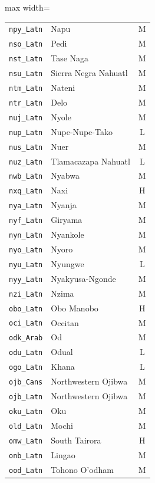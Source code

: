 {\begin{adjustbox}{max width=\textwidth}
\begin{tabular}{llc}
        \texttt{npy\_Latn} & Napu & M \\
        \texttt{nso\_Latn} & Pedi & M \\
        \texttt{nst\_Latn} & Tase Naga & M \\
        \texttt{nsu\_Latn} & Sierra Negra Nahuatl & M \\
        \texttt{ntm\_Latn} & Nateni & M \\
        \texttt{ntr\_Latn} & Delo & M \\
        \texttt{nuj\_Latn} & Nyole & M \\
        \texttt{nup\_Latn} & Nupe-Nupe-Tako & L \\
        \texttt{nus\_Latn} & Nuer & M \\
        \texttt{nuz\_Latn} & Tlamacazapa Nahuatl & L \\
        \texttt{nwb\_Latn} & Nyabwa & M \\
        \texttt{nxq\_Latn} & Naxi & H \\
        \texttt{nya\_Latn} & Nyanja & M \\
        \texttt{nyf\_Latn} & Giryama & M \\
        \texttt{nyn\_Latn} & Nyankole & M \\
        \texttt{nyo\_Latn} & Nyoro & M \\
        \texttt{nyu\_Latn} & Nyungwe & L \\
        \texttt{nyy\_Latn} & Nyakyusa-Ngonde & M \\
        \texttt{nzi\_Latn} & Nzima & M \\
        \texttt{obo\_Latn} & Obo Manobo & H \\
        \texttt{oci\_Latn} & Occitan & M \\
        \texttt{odk\_Arab} & Od & M \\
        \texttt{odu\_Latn} & Odual & L \\
        \texttt{ogo\_Latn} & Khana & L \\
        \texttt{ojb\_Cans} & Northwestern Ojibwa & M \\
        \texttt{ojb\_Latn} & Northwestern Ojibwa & M \\
        \texttt{oku\_Latn} & Oku & M \\
        \texttt{old\_Latn} & Mochi & M \\
        \texttt{omw\_Latn} & South Tairora & H \\
        \texttt{onb\_Latn} & Lingao & M \\
        \texttt{ood\_Latn} & Tohono O'odham & M \\

\end{tabular}
\end{adjustbox}}
